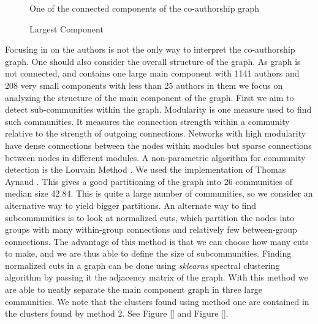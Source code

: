 \documentclass[journal,twocolumn]{IEEEtran}
\begin{document}
    \begin{figure}
        \begin{center}\end{center}
        \caption{One of the connected components of the co-authorship graph}
        \label{fig_plot}
    \end{figure}
    

    \begin{figure}
        \begin{center}\end{center}
        \caption{Largest Component}
        \label{author_collab_large}
    \end{figure}
    
    Focusing in on the authors is not the only way to interpret the
co-authorship graph. One should also consider the overall structure of
the graph. As graph is not connected, and contains one large main
component with 1141 authors and 208 very small components with less than
25 authors in them we focus on analyzing the structure of the main
component of the graph. First we aim to detect sub-communities within
the graph. Modularity is one measure used to find such communities. It
measures the connection strength within a community relative to the
strength of outgoing connections. Networks with high modularity have
dense connections between the nodes within modules but sparse
connections between nodes in different modules. A non-parametric
algorithm for community detection is the Louvain Method
\cite{blondel2008fast}. We used the implementation of Thomas Aynaud
\cite{louvain}. This gives a good partitioning of the graph into 26
communities of median size 42.84. This is quite a large number of
communities, so we consider an alternative way to yield bigger
partitions. An alternate way to find subcommunities is to look at
normalized cuts, which partition the nodes into groups with many
within-group connections and relatively few between-group connections.
The advantage of this method is that we can choose how many cuts to
make, and we are thus able to define the size of subcommunities. Finding
normalized cuts in a graph can be done using \emph{sklearns} spectral
clustering algorithm by passing it the adjacency matrix of the graph.
With this method we are able to neatly separate the main component graph
in three large communities. We note that the clusters found using method
one are contained in the clusters found by method 2. See Figure \ref{}
and Figure \ref{}.
\end{document}
